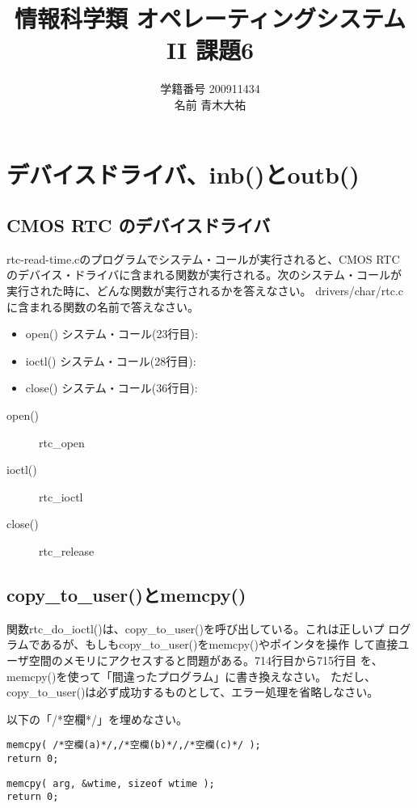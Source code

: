 \documentclass[a4j,9pt]{jsarticle}
\title{情報科学類 オペレーティングシステムII 課題6}
\author{学籍番号 200911434 \\ 名前 青木大祐}
\begin{document}
\maketitle
\setcounter{section}{5}
\section{デバイスドライバ、inb()とoutb()}
\setcounter{subsection}{600}

\subsection{CMOS RTC のデバイスドライバ}
\begin{screen}
{\ttfamily rtc-read-time.c}のプログラムでシステム・コールが実行されると、CMOS RTC
のデバイス・ドライバに含まれる関数が実行される。次のシステム・コールが
実行された時に、どんな関数が実行されるかを答えなさい。
{\ttfamily drivers/char/rtc.c}に含まれる関数の名前で答えなさい。
\begin{itemize}
 \item open() システム・コール(23行目):
 \item ioctl() システム・コール(28行目):
 \item close() システム・コール(36行目):
\end{itemize}
\end{screen}

\begin{description}
 \item[open()] rtc\_open
 \item[ioctl()] rtc\_ioctl
 \item[close()] rtc\_release
\end{description}

\subsection{copy\_to\_user()とmemcpy()}
\begin{screen}
関数{\ttfamily rtc\_do\_ioctl()}は、{\ttfamily copy\_to\_user()}を呼び出している。これは正しいプ
ログラムであるが、もしも{\ttfamily copy\_to\_user()}を{\ttfamily memcpy()}やポインタを操作
して直接ユーザ空間のメモリにアクセスすると問題がある。714行目から715行目
を、{\ttfamily memcpy()}を使って「間違ったプログラム」に書き換えなさい。
ただし、{\ttfamily copy\_to\_user()}は必ず成功するものとして、エラー処理を省略しなさい。

 以下の「/*空欄*/」を埋めなさい。

\begin{lstlisting}
memcpy( /*空欄(a)*/,/*空欄(b)*/,/*空欄(c)*/ );
return 0;
\end{lstlisting}
\end{screen}
\begin{lstlisting}
memcpy( arg, &wtime, sizeof wtime );
return 0;
\end{lstlisting}
\end{document}
